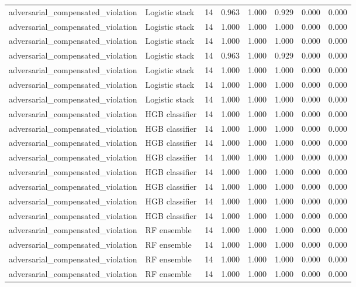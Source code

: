 {\begin{longtable}{llrrrrrr}
adversarial\_compensated\_violation & Logistic stack & 14 & 0.963 & 1.000 & 0.929 & 0.000 & 0.000 \\
adversarial\_compensated\_violation & Logistic stack & 14 & 1.000 & 1.000 & 1.000 & 0.000 & 0.000 \\
adversarial\_compensated\_violation & Logistic stack & 14 & 1.000 & 1.000 & 1.000 & 0.000 & 0.000 \\
adversarial\_compensated\_violation & Logistic stack & 14 & 0.963 & 1.000 & 0.929 & 0.000 & 0.000 \\
adversarial\_compensated\_violation & Logistic stack & 14 & 1.000 & 1.000 & 1.000 & 0.000 & 0.000 \\
adversarial\_compensated\_violation & Logistic stack & 14 & 1.000 & 1.000 & 1.000 & 0.000 & 0.000 \\
adversarial\_compensated\_violation & Logistic stack & 14 & 1.000 & 1.000 & 1.000 & 0.000 & 0.000 \\
adversarial\_compensated\_violation & HGB classifier & 14 & 1.000 & 1.000 & 1.000 & 0.000 & 0.000 \\
adversarial\_compensated\_violation & HGB classifier & 14 & 1.000 & 1.000 & 1.000 & 0.000 & 0.000 \\
adversarial\_compensated\_violation & HGB classifier & 14 & 1.000 & 1.000 & 1.000 & 0.000 & 0.000 \\
adversarial\_compensated\_violation & HGB classifier & 14 & 1.000 & 1.000 & 1.000 & 0.000 & 0.000 \\
adversarial\_compensated\_violation & HGB classifier & 14 & 1.000 & 1.000 & 1.000 & 0.000 & 0.000 \\
adversarial\_compensated\_violation & HGB classifier & 14 & 1.000 & 1.000 & 1.000 & 0.000 & 0.000 \\
adversarial\_compensated\_violation & HGB classifier & 14 & 1.000 & 1.000 & 1.000 & 0.000 & 0.000 \\
adversarial\_compensated\_violation & HGB classifier & 14 & 1.000 & 1.000 & 1.000 & 0.000 & 0.000 \\
adversarial\_compensated\_violation & RF ensemble & 14 & 1.000 & 1.000 & 1.000 & 0.000 & 0.000 \\
adversarial\_compensated\_violation & RF ensemble & 14 & 1.000 & 1.000 & 1.000 & 0.000 & 0.000 \\
adversarial\_compensated\_violation & RF ensemble & 14 & 1.000 & 1.000 & 1.000 & 0.000 & 0.000 \\
adversarial\_compensated\_violation & RF ensemble & 14 & 1.000 & 1.000 & 1.000 & 0.000 & 0.000 \\

\end{longtable}}
